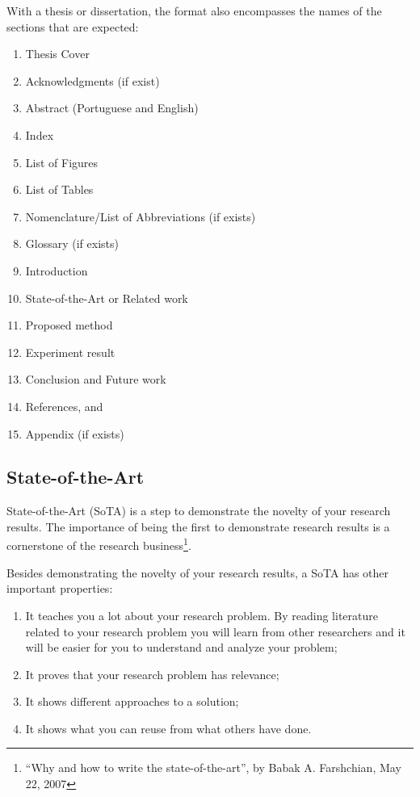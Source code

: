 With a thesis or dissertation, the format also encompasses the names of the sections that are expected:
\begin{enumerate}
    \item Thesis Cover
    \item Acknowledgments (if exist)
    \item Abstract (Portuguese and English)
    \item Index
    \item List of Figures
    \item List of Tables
    \item Nomenclature/List of Abbreviations (if exists)
    \item Glossary (if exists)
    \item Introduction
    \item State-of-the-Art or Related work
    \item Proposed method
    \item Experiment result
    \item Conclusion and Future work
    \item References, and
    \item Appendix (if exists)
\end{enumerate}

\subsection{State-of-the-Art}
\label{sec:state}

State-of-the-Art (SoTA) is a step to demonstrate the novelty of your research results. The importance of being the first to demonstrate research results is a cornerstone of the research business\footnote{``Why and how to write the state-of-the-art'', by Babak A. Farshchian, May 22, 2007}.

Besides demonstrating the novelty of your research results, a SoTA has other important properties:
\begin{enumerate}
    \item It teaches you a lot about your research problem. By reading literature related to your research problem you will learn from other researchers and it will be easier for you to understand and analyze your problem;
    \item It proves that your research problem has relevance;
    \item It shows different approaches to a solution;
    \item It shows what you can reuse from what others have done.
\end{enumerate}

